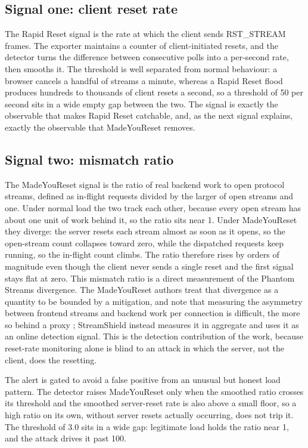 \documentclass[a4paper,fleqn]{cas-dc}
\begin{document}
\subsection{Signal one: client reset rate}\label{sec:signal-reset-rate}

The Rapid Reset signal is the rate at which the client sends RST\_STREAM frames. The exporter maintains a counter of client-initiated resets, and the detector turns the difference between consecutive polls into a per-second rate, then smooths it. The threshold is well separated from normal behaviour: a browser cancels a handful of streams a minute, whereas a Rapid Reset flood produces hundreds to thousands of client resets a second, so a threshold of 50 per second sits in a wide empty gap between the two. The signal is exactly the observable that makes Rapid Reset catchable, and, as the next signal explains, exactly the observable that MadeYouReset removes.

\subsection{Signal two: mismatch ratio}\label{sec:signal-mismatch}

The MadeYouReset signal is the ratio of real backend work to open protocol streams, defined as in-flight requests divided by the larger of open streams and one. Under normal load the two track each other, because every open stream has about one unit of work behind it, so the ratio sits near 1. Under MadeYouReset they diverge: the server resets each stream almost as soon as it opens, so the open-stream count collapses toward zero, while the dispatched requests keep running, so the in-flight count climbs. The ratio therefore rises by orders of magnitude even though the client never sends a single reset and the first signal stays flat at zero. This mismatch ratio is a direct measurement of the Phantom Streams divergence. The MadeYouReset authors treat that divergence as a quantity to be bounded by a mitigation, and note that measuring the asymmetry between frontend streams and backend work per connection is difficult, the more so behind a proxy \cite{madeyouresetPaper}; StreamShield instead measures it in aggregate and uses it as an online detection signal. This is the detection contribution of the work, because reset-rate monitoring alone is blind to an attack in which the server, not the client, does the resetting.

The alert is gated to avoid a false positive from an unusual but honest load pattern. The detector raises MadeYouReset only when the smoothed ratio crosses its threshold and the smoothed server-reset rate is also above a small floor, so a high ratio on its own, without server resets actually occurring, does not trip it. The threshold of 3.0 sits in a wide gap: legitimate load holds the ratio near 1, and the attack drives it past 100.
\end{document}
